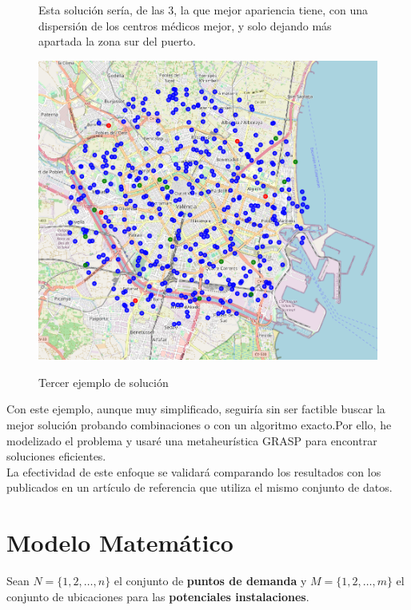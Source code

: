 \documentclass[12pt,a4paper]{book}
\begin{document}
\begin{figure}[H]
    \centering
    \begin{minipage}[c]{0.45\textwidth}
        Esta solución sería, de las 3, la que mejor apariencia tiene, con una dispersión de los centros médicos mejor, y solo dejando más apartada la zona sur del puerto.
    \end{minipage}
    \hfill
    \begin{minipage}[c]{0.45\textwidth}
        \includegraphics[width=\textwidth]{images/solucion_ejemplo_3.png}
        \label{fig:ejemplo_3}
    \end{minipage}
    \caption{Tercer ejemplo de solución}
\end{figure}

 Con este ejemplo, aunque muy simplificado, seguiría sin ser factible buscar la mejor solución probando combinaciones
 o con un algoritmo exacto.Por ello, he modelizado el problema y usaré una metaheurística GRASP para encontrar soluciones eficientes.\\
 La efectividad de este enfoque se validará comparando los resultados con los publicados en un artículo de referencia que utiliza el mismo conjunto de datos.

\section{Modelo Matemático}

Sean $N=\{1, 2, \dots, n\}$ el conjunto de \textbf{puntos de demanda} y $M=\{1, 2, \dots, m\}$ el conjunto de ubicaciones para las \textbf{potenciales instalaciones}.
\end{document}
